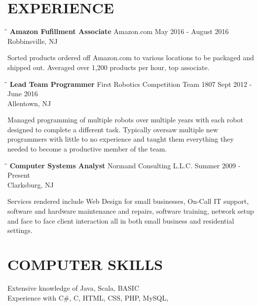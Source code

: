 \documentclass{res}
\begin{document}
\begin{resume}
\section{EXPERIENCE}
   \vspace{-0.1in}	
   \begin{tabbing}
   \hspace{2.3in}\= \hspace{2.6in}\= \kill %
    {\bf Amazon Fufillment Associate} \>Amazon.com    \>May 2016 - August 2016\\
                             \>Robbinsville, NJ
   \end{tabbing}\vspace{-20pt}      %
    Sorted products ordered off Amazon.com to various locations to be packaged and shipped out. Averaged over 1,200 products per hour, top associate.
   \begin{tabbing}
   \hspace{2.3in}\= \hspace{2.6in}\= \kill %
    {\bf Lead Team Programmer} \>First Robotics Competition Team 1807 \>  Sept 2012 - June 2016 \\
                          \>Allentown, NJ
   \end{tabbing}\vspace{-20pt}
    Managed programming of multiple robots over multiple years with each robot designed to complete a different task. Typically oversaw multiple new programmers with little to no experience
     and taught  them everything they needed to become a productive member of the team.  \begin{tabbing}%
   \hspace{2.3in}\= \hspace{2.6in}\= \kill %
   {\bf Computer Systems Analyst}  \>Normand Consulting L.L.C. \> Summer 2009 - Present\\
                          \>Clarksburg, NJ
   \end{tabbing}\vspace{-20pt}
    Services rendered include Web Design for small businesses, On-Call IT support, software and hardware maintenance and repairs, software training, network setup and face to face client interaction all in both
    small business and residential settings.


\section{COMPUTER SKILLS}          
    Extensive knowledge of Java, Scala, BASIC  \\ 
    Experience with C\#, C, HTML, CSS, PHP, MySQL,     \\        
            

\end{resume}
\end{document}
